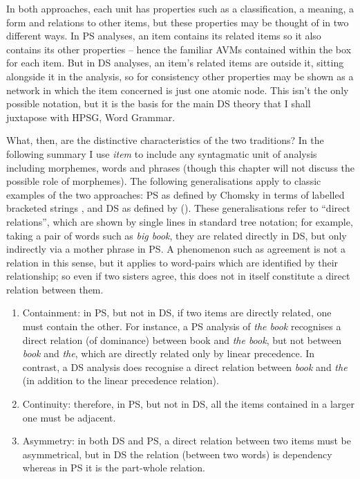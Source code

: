 \documentclass[output=paper]{langscibook}
\begin{document}
In both approaches, each unit has properties such as a classification, a meaning, a form and relations to other items, but these properties may be thought of in two different ways. In PS analyses, an item contains its related items so it also contains its other properties – hence the familiar AVMs contained within the box for each item. But in DS analyses, an item’s related items are outside it, sitting alongside it in the analysis, so for consistency other properties may be shown as a network in which the item concerned is just one atomic node. This isn’t the only possible notation, but it is the basis for the main DS theory that I shall juxtapose with HPSG, Word Grammar.

What, then, are the distinctive characteristics of the two traditions? In the following summary I use \emph{item} to include any syntagmatic unit of analysis including morphemes, words and phrases (though this chapter will not discuss the possible role of morphemes). The following generalisations apply to classic examples of the two approaches: PS as defined by Chomsky in terms of labelled bracketed strings \citep{Chomsky57a}, and DS as defined by \citeauthor{Tesniere59a-u} (\citeyear{Tesniere59a-u,Tesniere2015a-u}). These generalisations refer to ``direct relations'', which are shown by single lines in standard tree notation; for example, taking a pair of words such as \emph{big book}, they are related directly in DS, but only indirectly via a mother phrase in PS. A phenomenon such as agreement is not a relation in this sense, but it applies to word-pairs which are identified by their relationship; so even if two sisters agree, this does not in itself constitute a direct relation between them.

\begin{enumerate}
	\item\label{it:1} Containment: in PS, but not in DS, if two items are directly related, one must contain the other. For instance, a PS analysis of \emph{the book} recognises a direct relation (of dominance) between book and \emph{the book}, but not between \emph{book} and \emph{the}, which are directly related only by linear precedence. In contrast, a DS analysis does recognise a direct relation between \emph{book} and \emph{the} (in addition to the linear precedence relation).
	
	\item\label{it:2}  Continuity: therefore, in PS, but not in DS, all the items contained in a larger one must be adjacent.
	
	\item\label{it:3} Asymmetry: in both DS and PS, a direct relation between two items must be asymmetrical, but in DS the relation (between two words) is dependency whereas in PS it is the part-whole relation.
\end{enumerate}
\end{document}
